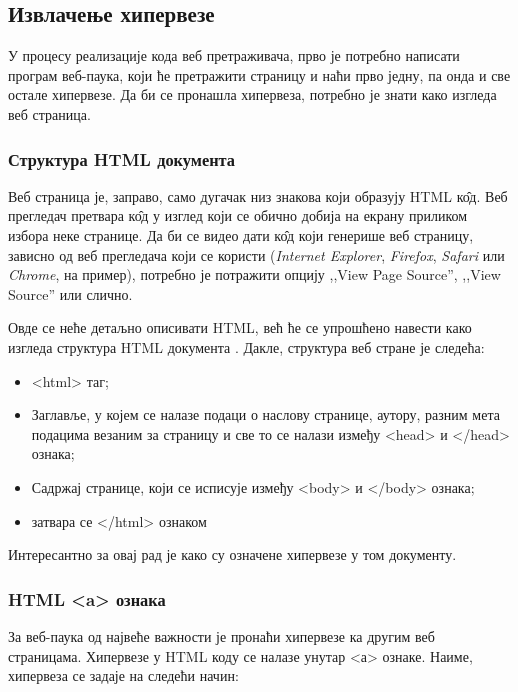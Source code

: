 \subsection{Извлачење хипервезе}

У процесу реализације кода веб претраживача, прво је потребно написати
програм веб-паука, који ће претражити страницу и наћи прво једну, па онда и све остале хипервезе. Да би се пронашла хипервеза, потребно је знати како изгледа веб страница.

\subsubsection{Структура HTML документа}

Веб страница
је, заправо, само дугачак низ знакова који образују HTML к\^{о}д. Веб прегледач претвара к\^{о}д у изглед који се обично добија на екрану приликом избора неке странице. Да би се видео дати к\^{о}д који генерише веб страницу,  зависно од веб прегледача који се користи (\emph{Internet Explorer}, \emph{Firefox}, \emph{Safari} или \emph{Chrome}, на пример), потребно је потражити опцију ,,View Page Source'', ,,View Source'' или слично.

Овде се неће детаљно описивати HTML, већ ће се упрошћено
навести како изгледа структура HTML документа \cite{strukturaHTML}. Дакле, структура веб стране је следећа:

\begin{itemize}
\item <html> таг;
\item Заглавље, у којем се налазе подаци о наслову странице, аутору, разним  мета подацима везаним за страницу и све то се налази између <head> и </head> ознака;
\item Садржај странице, који се исписује између <body> и </body> ознака;
\item затвара се </html> ознаком
\end{itemize}

Интересантно за овај рад је како су означене хипервезе у том документу.

\subsubsection{HTML <a> ознака}
За веб-паука од највеће важности је пронаћи хипервезе ка другим  веб страницама. Хипервезе у HTML коду се налазе унутар <а> ознаке. Наиме, хипервеза се задаје на следећи начин:

